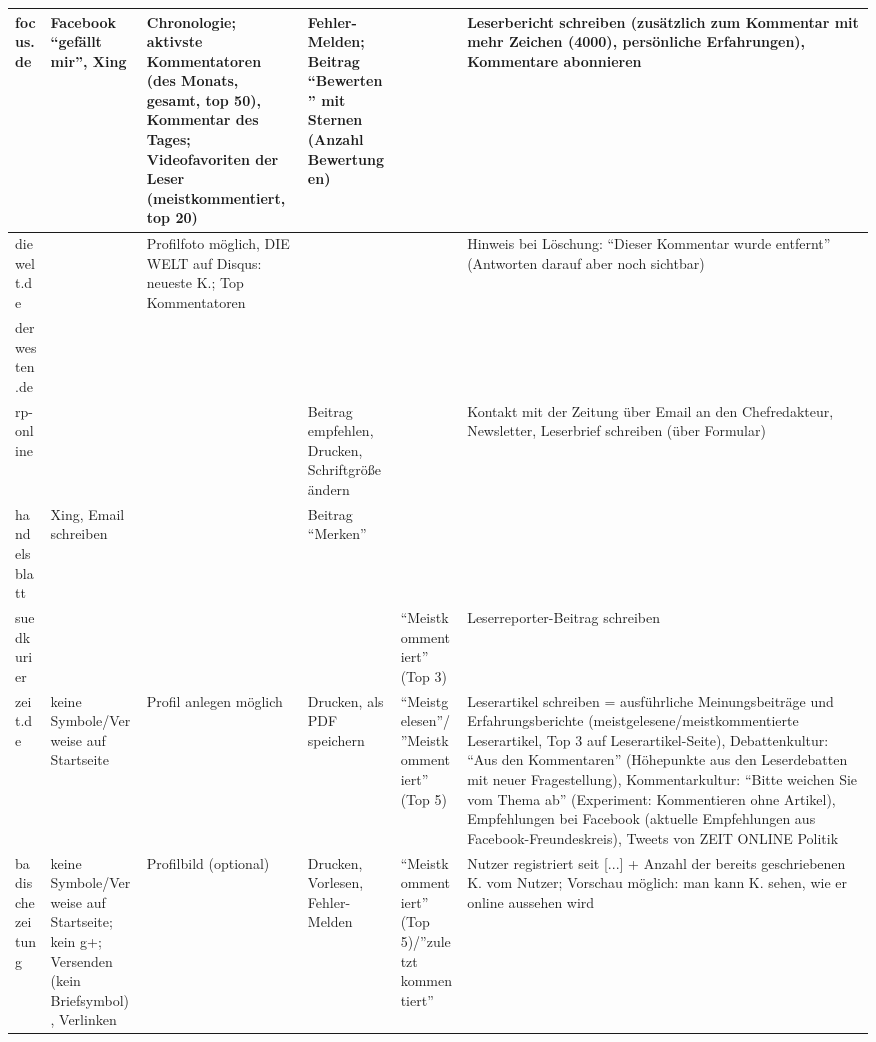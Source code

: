 \begin{landscape}
\begin{longtable}{l*{5}{p{32mm}}}
focus.de
& Facebook ``gefällt mir'', Xing
& Chronologie; aktivste Kommentatoren (des Monats, gesamt, top 50), Kommentar
  des Tages; Videofavoriten der Leser (meistkommentiert, top 20)
& Fehler-Melden; Beitrag ``Bewerten'' mit Sternen (Anzahl Bewertungen)
&
& Leserbericht schreiben (zusätzlich zum Kommentar mit mehr Zeichen (4000),
  persönliche Erfahrungen), Kommentare abonnieren
\\\midrule

diewelt.de
&
& Profilfoto möglich, DIE WELT auf Disqus: neueste K.; Top Kommentatoren
&
&
& Hinweis bei Löschung: ``Dieser Kommentar wurde entfernt'' (Antworten darauf
  aber noch sichtbar)
\\\midrule

derwesten.de
&
&
&
&
&
\\\midrule

rp-online
&
&
& Beitrag empfehlen, Drucken, Schriftgröße ändern
&
& Kontakt mit der Zeitung über Email an den Chefredakteur, Newsletter,
  Leserbrief schreiben (über Formular)
\\\midrule

handelsblatt
& Xing, Email schreiben
&
& Beitrag ``Merken''
&
&
\\\midrule

suedkurier
&
&
&
& ``Meistkommentiert''  (Top 3)
& Leserreporter-Beitrag schreiben
\\\midrule

zeit.de
& keine Symbole/Verweise auf Startseite
& Profil anlegen möglich
& Drucken, als PDF speichern
& ``Meistgelesen''/''Meistkommentiert'' (Top 5)
& Leserartikel schreiben = ausführliche Meinungsbeiträge und Erfahrungsberichte
  (meistgelesene/meistkommentierte Leserartikel, Top 3 auf Leserartikel-Seite),
  Debattenkultur: ``Aus den Kommentaren'' (Höhepunkte aus den Leserdebatten mit
  neuer Fragestellung), Kommentarkultur: ``Bitte weichen Sie vom Thema ab''
  (Experiment: Kommentieren ohne Artikel), Empfehlungen bei Facebook (aktuelle
  Empfehlungen aus Facebook-Freundeskreis), Tweets von ZEIT ONLINE Politik
\\\midrule

badische zeitung
& keine Symbole/Verweise auf Startseite; kein g+; Versenden (kein Briefsymbol),
  Verlinken
& Profilbild (optional)
& Drucken, Vorlesen, Fehler-Melden
& ``Meistkommentiert'' (Top 5)/''zuletzt kommentiert''
& Nutzer registriert seit [...] + Anzahl der bereits geschriebenen K. vom
  Nutzer; Vorschau möglich: man kann K. sehen, wie er online aussehen wird
\\\midrule


\end{longtable}
\end{landscape}
